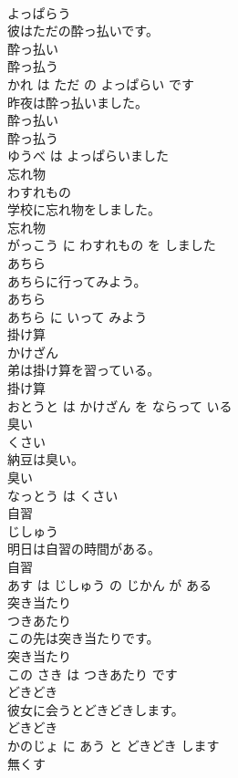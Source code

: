 \documentclass[8pt]{extreport}
\begin{document}
\begin{CJK}{UTF8}{min}
\\	よっぱらう			
\\	彼はただの酔っ払いです。	
\\	酔っ払い 
\\	酔っ払う 
\\	かれ は ただ の よっぱらい です			
\\	昨夜は酔っ払いました。	
\\	酔っ払い 
\\	酔っ払う 
\\	ゆうべ は よっぱらいました			
\\	忘れ物	
\\	わすれもの			
\\	学校に忘れ物をしました。	
\\	忘れ物 
\\	がっこう に わすれもの を しました			
\\	あちら	
\\	あちらに行ってみよう。	
\\	あちら 
\\	あちら に いって みよう			
\\	掛け算	
\\	かけざん			
\\	弟は掛け算を習っている。	
\\	掛け算 
\\	おとうと は かけざん を ならって いる			
\\	臭い	
\\	くさい			
\\	納豆は臭い。	
\\	臭い 
\\	なっとう は くさい			
\\	自習	
\\	じしゅう			
\\	明日は自習の時間がある。	
\\	自習 
\\	あす は じしゅう の じかん が ある			
\\	突き当たり	
\\	つきあたり			
\\	この先は突き当たりです。	
\\	突き当たり 
\\	この さき は つきあたり です			
\\	どきどき	
\\	彼女に会うとどきどきします。	
\\	どきどき 
\\	かのじょ に あう と どきどき します			
\\	無くす	

\end{CJK}
\end{document}
